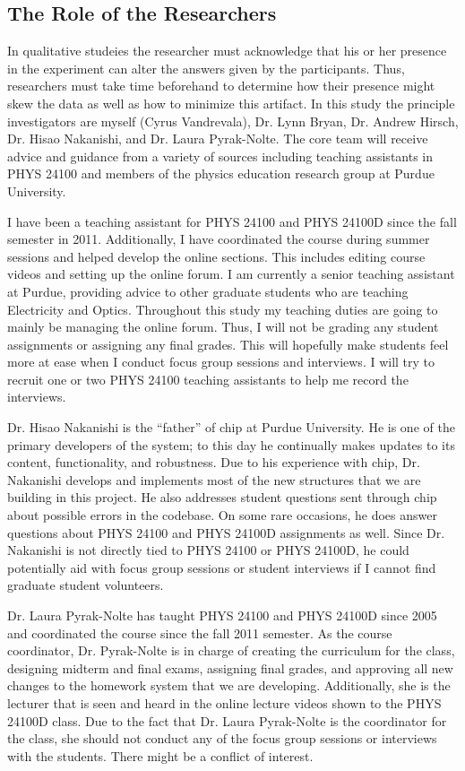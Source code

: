 \subsection{The Role of the Researchers}

In qualitative studeies the researcher must acknowledge that his or her presence in the experiment can alter the answers given by the participants. Thus, researchers must take time beforehand to determine how their presence might skew the data as well as how to minimize this artifact\cite{denzin2012}. In this study the principle investigators are myself (Cyrus Vandrevala), Dr. Lynn Bryan, Dr. Andrew Hirsch, Dr. Hisao Nakanishi, and Dr. Laura Pyrak-Nolte. The core team will receive advice and guidance from a variety of sources including teaching assistants in PHYS 24100 and members of the physics education research group at Purdue University.

I have been a teaching assistant for PHYS 24100 and PHYS 24100D since the fall semester in 2011. Additionally, I have coordinated the course during summer sessions and helped develop the online sections. This includes editing course videos and setting up the online forum\cite{piazza}. I am currently a senior teaching assistant at Purdue, providing advice to other graduate students who are teaching Electricity and Optics. Throughout this study my teaching duties are going to mainly be managing the online forum. Thus, I will not be grading any student assignments or assigning any final grades. This will hopefully make students feel more at ease when I conduct focus group sessions and interviews. I will try to recruit one or two PHYS 24100 teaching assistants to help me record the interviews.

Dr. Hisao Nakanishi is the ``father'' of \gls{chip} at Purdue University. He is one of the primary developers of the system; to this day he continually makes updates to its content, functionality, and robustness. Due to his experience with \gls{chip}, Dr. Nakanishi develops and implements most of the new structures that we are building in this project. He also addresses student questions sent through \gls{chip} about possible errors in the codebase. On some rare occasions, he does answer questions about PHYS 24100 and PHYS 24100D assignments as well. Since Dr. Nakanishi is not directly tied to PHYS 24100 or PHYS 24100D, he could potentially aid with focus group sessions or student interviews if I cannot find graduate student volunteers.

Dr. Laura Pyrak-Nolte has taught PHYS 24100 and PHYS 24100D since 2005 and coordinated the course since the fall 2011 semester. As the course coordinator, Dr. Pyrak-Nolte is in charge of creating the curriculum for the class, designing midterm and final exams, assigning final grades, and approving all new changes to the homework system that we are developing. Additionally, she is the lecturer that is seen and heard in the online lecture videos shown to the PHYS 24100D class. Due to the fact that Dr. Laura Pyrak-Nolte is the coordinator for the class, she should not conduct any of the focus group sessions or interviews with the students. There might be a conflict of interest.

